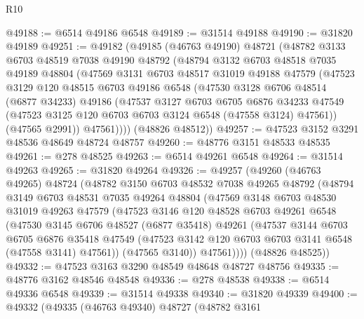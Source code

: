 \begin{lexlean}{R10}
\begin{coremodule}
@49188 := @6514 @49186 @6548
@49189 := @31514 @49188
@49190 := @31820 @49189
@49251 := @49182
    (@49185
      (@46763 @49190)
      @48721
      (@48782
        @3133
        @6703
        @48519
        @7038
        @49190
        @48792
        (@48794
          @3132
          @6703
          @48518
          @7035
          @49189
          @48804
          (@47569
            @3131
            @6703
            @48517
            @31019
            @49188
            @47579
            (@47523
              @3129
              @120
              @48515
              @6703
              @49186
              @6548
              (@47530
                @3128
                @6706
                @48514
                (@6877 @34233)
                @49186
                (@47537
                  @3127
                  @6703
                  @6705
                  @6876
                  @34233
                  @47549
                  (@47523 @3125 @120 @6703 @6703 @3124 @6548 (@47558 @3124) @47561))
                (@47565 @2991))
              @47561))))
      (@48826 @48512))
@49257 := @47523 @3152 @3291 @48536 @48649 @48724 @48757
@49260 := @48776 @3151 @48533 @48535
@49261 := @278 @48525
@49263 := @6514 @49261 @6548
@49264 := @31514 @49263
@49265 := @31820 @49264
@49326 := @49257
    (@49260
      (@46763 @49265)
      @48724
      (@48782
        @3150
        @6703
        @48532
        @7038
        @49265
        @48792
        (@48794
          @3149
          @6703
          @48531
          @7035
          @49264
          @48804
          (@47569
            @3148
            @6703
            @48530
            @31019
            @49263
            @47579
            (@47523
              @3146
              @120
              @48528
              @6703
              @49261
              @6548
              (@47530
                @3145
                @6706
                @48527
                (@6877 @35418)
                @49261
                (@47537
                  @3144
                  @6703
                  @6705
                  @6876
                  @35418
                  @47549
                  (@47523 @3142 @120 @6703 @6703 @3141 @6548 (@47558 @3141) @47561))
                (@47565 @3140))
              @47561))))
      (@48826 @48525))
@49332 := @47523 @3163 @3290 @48549 @48648 @48727 @48756
@49335 := @48776 @3162 @48546 @48548
@49336 := @278 @48538
@49338 := @6514 @49336 @6548
@49339 := @31514 @49338
@49340 := @31820 @49339
@49400 := @49332
    (@49335
      (@46763 @49340)
      @48727
      (@48782
        @3161

\end{coremodule}
\end{lexlean}
